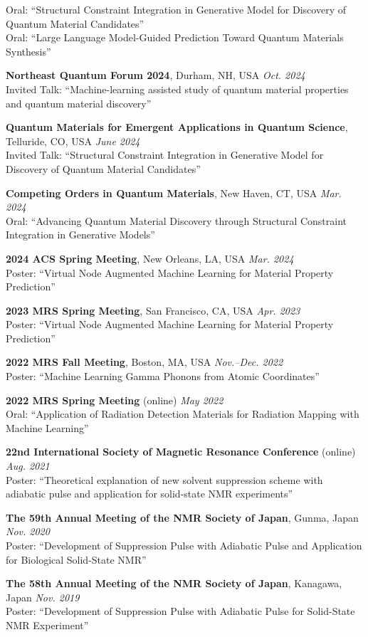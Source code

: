 \documentclass[10pt,a4paper]{article}
\begin{document}
\begin{cvenum}
    Oral: ``Structural Constraint Integration in Generative Model for Discovery of Quantum Material Candidates''\\
    Oral: ``Large Language Model-Guided Prediction Toward Quantum Materials Synthesis''
  \item \textbf{Northeast Quantum Forum 2024}, Durham, NH, USA \textbar{} \textit{Oct. 2024}\\
    Invited Talk: ``Machine-learning assisted study of quantum material properties and quantum material discovery''
  \item \textbf{Quantum Materials for Emergent Applications in Quantum Science}, Telluride, CO, USA \textbar{} \textit{June 2024}\\
    Invited Talk: ``Structural Constraint Integration in Generative Model for Discovery of Quantum Material Candidates''
  \item \textbf{Competing Orders in Quantum Materials}, New Haven, CT, USA \textbar{} \textit{Mar. 2024}\\
    Oral: ``Advancing Quantum Material Discovery through Structural Constraint Integration in Generative Models''
  \item \textbf{2024 ACS Spring Meeting}, New Orleans, LA, USA \textbar{} \textit{Mar. 2024}\\
    Poster: ``Virtual Node Augmented Machine Learning for Material Property Prediction''
  \item \textbf{2023 MRS Spring Meeting}, San Francisco, CA, USA \textbar{} \textit{Apr. 2023}\\
    Poster: ``Virtual Node Augmented Machine Learning for Material Property Prediction''
  \item \textbf{2022 MRS Fall Meeting}, Boston, MA, USA \textbar{} \textit{Nov.--Dec. 2022}\\
    Poster: ``Machine Learning Gamma Phonons from Atomic Coordinates''
  \item \textbf{2022 MRS Spring Meeting} (online) \textbar{} \textit{May 2022}\\
    Oral: ``Application of Radiation Detection Materials for Radiation Mapping with Machine Learning''
  \item \textbf{22nd International Society of Magnetic Resonance Conference} (online) \textbar{} \textit{Aug. 2021}\\
    Poster: ``Theoretical explanation of new solvent suppression scheme with adiabatic pulse and application for solid-state NMR experiments''
  \item \textbf{The 59th Annual Meeting of the NMR Society of Japan}, Gunma, Japan \textbar{} \textit{Nov. 2020}\\
    Poster: ``Development of Suppression Pulse with Adiabatic Pulse and Application for Biological Solid-State NMR''
  \item \textbf{The 58th Annual Meeting of the NMR Society of Japan}, Kanagawa, Japan \textbar{} \textit{Nov. 2019}\\
    Poster: ``Development of Suppression Pulse with Adiabatic Pulse for Solid-State NMR Experiment''
\end{cvenum}
\end{document}
